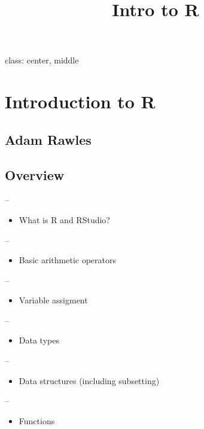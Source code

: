 \documentclass[]{article}
\title{Intro to R}
\author{}
\date{}
\providecommand{\tightlist}{%
  \setlength{\itemsep}{0pt}\setlength{\parskip}{0pt}}
\begin{document}
\maketitle

class: center, middle

\hypertarget{introduction-to-r}{%
\section{Introduction to R}\label{introduction-to-r}}

\hypertarget{adam-rawles}{%
\subsection{Adam Rawles}\label{adam-rawles}}

\hypertarget{overview}{%
\subsection{Overview}\label{overview}}

--

\begin{itemize}
\tightlist
\item
  What is R and RStudio?
\end{itemize}

--

\begin{itemize}
\tightlist
\item
  Basic arithmetic operators
\end{itemize}

--

\begin{itemize}
\tightlist
\item
  Variable assigment
\end{itemize}

--

\begin{itemize}
\tightlist
\item
  Data types
\end{itemize}

--

\begin{itemize}
\tightlist
\item
  Data structures (including subsetting)
\end{itemize}

--

\begin{itemize}
\tightlist
\item
  Functions
\end{itemize}
\end{document}
